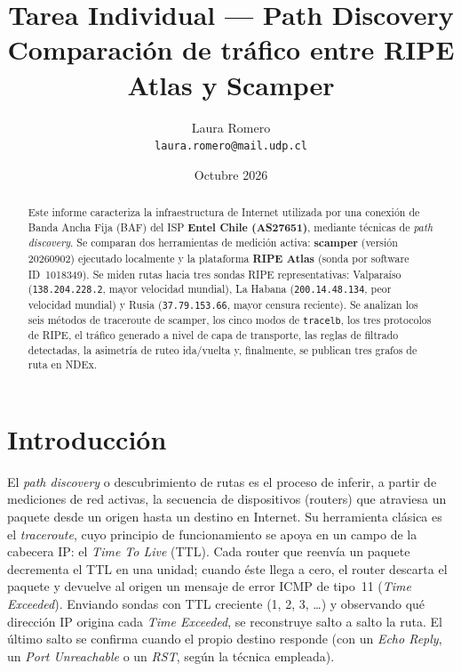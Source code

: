 \documentclass[11pt,a4paper]{article}
\title{\textbf{Tarea Individual --- Path Discovery}\\[0.3em]
\large Comparación de tráfico entre RIPE Atlas y Scamper}
\author{Laura Romero \\ \texttt{laura.romero@mail.udp.cl}}
\date{Octubre 2026}
\newcommand{\ip}[1]{\texttt{#1}}
\begin{document}
\maketitle

\begin{abstract}
\noindent Este informe caracteriza la infraestructura de Internet utilizada por una conexión de
Banda Ancha Fija (BAF) del ISP \textbf{Entel Chile (AS27651)}, mediante técnicas de
\emph{path discovery}. Se comparan dos herramientas de medición activa: \textbf{scamper}
(versión 20260902) ejecutado localmente y la plataforma \textbf{RIPE Atlas} (sonda por software
ID~1018349). Se miden rutas hacia tres sondas RIPE representativas: Valparaíso
(\ip{138.204.228.2}, mayor velocidad mundial), La Habana (\ip{200.14.48.134}, peor velocidad
mundial) y Rusia (\ip{37.79.153.66}, mayor censura reciente). Se analizan los seis métodos de
traceroute de scamper, los cinco modos de \texttt{tracelb}, los tres protocolos de RIPE, el
tráfico generado a nivel de capa de transporte, las reglas de filtrado detectadas, la
asimetría de ruteo ida/vuelta y, finalmente, se publican tres grafos de ruta en NDEx.
\end{abstract}

\tableofcontents
\clearpage

\section{Introducción}
El \emph{path discovery} o descubrimiento de rutas es el proceso de inferir, a partir de
mediciones de red activas, la secuencia de dispositivos (routers) que atraviesa un paquete
desde un origen hasta un destino en Internet. Su herramienta clásica es el \emph{traceroute},
cuyo principio de funcionamiento se apoya en un campo de la cabecera IP: el \emph{Time To Live}
(TTL). Cada router que reenvía un paquete decrementa el TTL en una unidad; cuando éste llega a
cero, el router descarta el paquete y devuelve al origen un mensaje de error ICMP de tipo~11
(\emph{Time Exceeded}). Enviando sondas con TTL creciente (1, 2, 3, \dots) y observando qué
dirección IP origina cada \emph{Time Exceeded}, se reconstruye salto a salto la ruta. El último
salto se confirma cuando el propio destino responde (con un \emph{Echo Reply}, un
\emph{Port Unreachable} o un \emph{RST}, según la técnica empleada).
\end{document}
